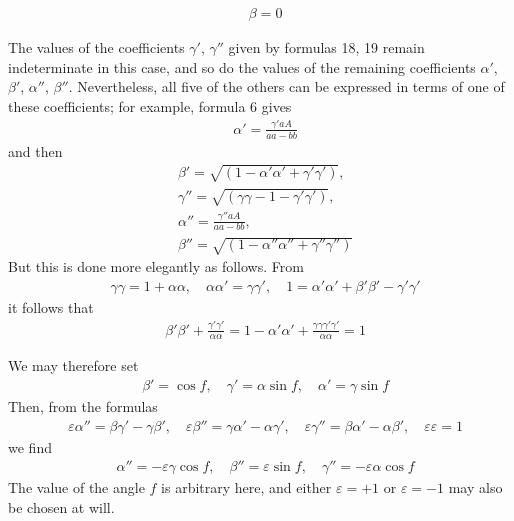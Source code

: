 \[
\begin{aligned}
&\beta=0
\end{aligned}
\]
\par The values of the coefficients $\gamma'$, $\gamma''$ given by formulas 18, 19 remain indeterminate in this case, and so do the values of the remaining coefficients $\alpha'$, $\beta'$, $\alpha''$, $\beta''$. Nevertheless, all five of the others can be expressed in terms of one of these coefficients; for example, formula 6 gives
\[
\begin{aligned}
&\alpha'=\frac{\gamma'aA}{aa-bb}
\end{aligned}
\]
and then
\[
\begin{aligned}
&\beta'=\surd{(1-\alpha'\alpha'+\gamma'\gamma')},\\[6pt]
&
\gamma''=\surd{(\gamma\gamma-1-\gamma'\gamma')},\\[6pt]
&
\alpha''=\frac{\gamma''aA}{aa-bb},\\[6pt]
&
\beta''{}=\surd{(1-\alpha''\alpha''+\gamma''\gamma'')}
\end{aligned}
\]
But this is done more elegantly as follows. From
\[
\begin{aligned}
&\gamma\gamma=1+\alpha\alpha,\quad
\alpha\alpha'=\gamma\gamma',\quad
1=\alpha'\alpha'+\beta'\beta'-\gamma'\gamma'
\end{aligned}
\]
it follows that
\[
\begin{aligned}
&\beta'\beta'+\frac{\gamma'\gamma'}{\alpha\alpha}
=1-\alpha'\alpha'+\frac{\gamma\gamma\gamma'\gamma'}{\alpha\alpha}=1
\end{aligned}
\]
\par We may therefore set
\[
\begin{aligned}
&\beta'=\cos f,\quad\gamma'=\alpha\sin f,\quad\alpha'=\gamma\sin f
\end{aligned}
\]
Then, from the formulas
\[
\begin{aligned}
&\varepsilon\alpha''=\beta\gamma'-\gamma\beta',\quad
\varepsilon\beta''=\gamma\alpha'-\alpha\gamma',\quad
\varepsilon\gamma''=\beta\alpha'-\alpha\beta',\quad
\varepsilon\varepsilon=1
\end{aligned}
\]
we find
\[
\begin{aligned}
&\alpha''=-\varepsilon\gamma\cos f,\quad
\beta''=\varepsilon\sin f,\quad
\gamma''=-\varepsilon\alpha\cos f
\end{aligned}
\]
The value of the angle $f$ is arbitrary here, and either $\varepsilon=+1$ or $\varepsilon=-1$ may also be chosen at will.

